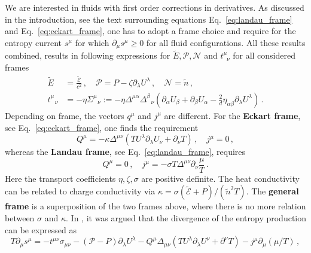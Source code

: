\documentclass[superscriptaddress,prd,nofootinbib,preprintnumbers,longbibliography,11pt,eqsecnum]{revtex4-1}
\def\d{\partial}
\def\CN{\mathcal{N}}
\def\CP{\mathcal{P}}
\begin{document}
We are interested in fluids with first order corrections in derivatives. As discussed in the introduction, see the text surrounding equations Eq.~\eqref{eq:landau_frame} and Eq.~\eqref{eq:eckart_frame}, one has to adopt a frame choice and require for the entropy current $s^{\mu}$ for which $\partial_{\mu}s^{\mu}\geq0$ for all fluid configurations. All these results combined, results in following expressions for $\tilde E,\CP, \CN$ and $t^\mu_{\;\; \nu}$ for all considered frames \cite{Kovtun:2012rj}
\begin{equation}\label{eq:Lorentz-derivatives corrections}
\begin{aligned}
	\tilde{E}&=\frac{\tilde{\mathcal{E}}}{c^{2}}
	\,,
	\quad
	\mathcal{P}
	=
	P
	-
	\zeta\partial_{\lambda}U^{\lambda}
	\,,\quad
	\mathcal{N}=\tilde{n}
	\,,\\
	t^{\mu}_{\;\;\,\nu}
	&=
	-\eta \Sigma^{\mu}_{\;\;\,\nu}
	:=-
	\eta\Delta^{\mu\alpha}\Delta^{\beta}_{\;\;\,\nu}
	\left( \partial_{\alpha}U_{\beta}
		+
		\partial_{\beta}U_{\alpha}
		-
		\frac{2}{d}\eta_{\alpha\beta}\partial_{\lambda}U^{\lambda}\right)\,.
  \end{aligned}
\end{equation}
Depending on frame, the vectors $q^{\mu}$ and $j^{\mu}$ are different. For the \textbf{Eckart frame}, see Eq.~\eqref{eq:eckart_frame}, one finds the requirement
\begin{equation}
	Q^{\mu}=-\kappa\Delta^{\mu\nu}(TU^{\lambda}\partial_{\lambda}U_{\nu}+\partial_{\nu}T)
	\,,
	\quad
	j^{\mu}
	=
	0
	\,,
\end{equation}
whereas the \textbf{Landau frame}, see Eq.~\eqref{eq:landau_frame}, requires
\begin{equation}
	Q^{\mu}=0
	\,,
	\quad
	j^{\mu}
	=
	-
	\sigma T\Delta^{\mu\nu}\partial_{\nu}\frac{\mu}{T}
\,.
\end{equation}
Here the transport coefficients $\eta,\zeta,\sigma$ are positive definite. The heat conductivity can be related to charge conductivity via $\kappa=\sigma(\tilde{\mathcal{E}}+P)/(\tilde{n}^{2}T)$. The \textbf{general frame} is a superposition of the two frames above, where there is no more relation between $\sigma$ and $\kappa$. In \cite{Hiscock:1985zz}, it was argued that the divergence of the entropy production can be expressed as 
\begin{equation}
 T \d_\mu s^\mu = - t^{\mu \nu} \sigma_{\mu \nu}   -(\CP-P) \d_\lambda U^\lambda-Q^\mu \Delta_{\mu \nu} \left( T  U^\lambda \d_\lambda U^\nu + \d^\nu T  \right) - j^\mu \d_\mu(\mu /T)
 \,,
\end{equation}
\end{document}
